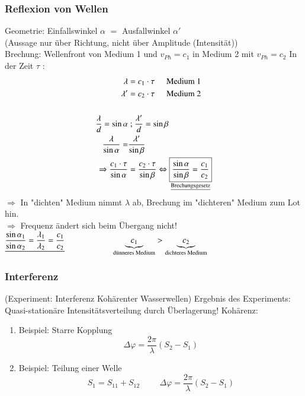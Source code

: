 \subsubsection{Reflexion von Wellen}
\bild
{}
Geometrie: Einfallswinkel $ \alpha $ $ = $ Ausfallwinkel $ \alpha' $\\
(Aussage nur über Richtung, nicht über Amplitude (Intensität))\\
Brechung: Wellenfront von Medium 1 und $ v_{Ph} = c_1 $ in Medium 2 mit $ v_{Ph} = c_2 $
\bild
In der Zeit $ \tau $ : \begin{align*}
\lambda &= c_1 \cdot \tau \hspace{5mm} \text{Medium 1}\\
\lambda' &= c_2 \cdot \tau \hspace{5mm} \text{Medium 2}\\
\enter
\frac{\lambda}{d} = \sin\alpha& \text{ ; } \frac{\lambda'}{d} = \sin\beta\\
\frac{\lambda}{\sin\alpha} =& \frac{\lambda'}{\sin\beta}\\
\Rightarrow \frac{c_1 \cdot \tau}{\sin\alpha} &= \frac{c_2 \cdot \tau}{\sin\beta} \Leftrightarrow \underset{\underline{\text{Brechungsgesetz}}}{\boxed{\frac{\sin\alpha}{\sin\beta} = \frac{c_1}{c_2}}}
\end{align*}
$ \Rightarrow $ In "dichten" Medium nimmt $ \lambda $ ab, Brechung im "dichteren" Medium zum Lot hin.\\
$ \Rightarrow $ Frequenz ändert sich beim Übergang nicht!\enter\enter
\begin{math}
{\displaystyle \underline{\frac{\sin\alpha_1}{\sin\alpha_2} = \frac{\lambda_1}{\lambda_2} = \frac{c_1}{c_2}}} \hspace{2cm} \underbrace{c_1}_{\text{dünneres Medium}} > \underbrace{c_2}_{\text{dichteres Medium}}
\end{math}
\enter
\HL
\subsubsection{Interferenz} (Experiment: Interferenz Kohärenter Wasserwellen)
Ergebnis des Experiments: Quasi-stationäre Intensitätsverteilung durch Überlagerung!\enter\enter
Kohärenz: \begin{enumerate}
	\item Beispiel: Starre Kopplung
	\bild
	$$ \Delta\varphi=\frac{2\pi}{\lambda}(S_2-S_1) $$
	\item Beispiel: Teilung einer Welle
	\bild
	$$ S_1 = S_{11}+S_{12} \hspace{1cm} \Delta\varphi=\frac{2\pi}{\lambda}(S_{2}-S_{1}) $$
\end{enumerate}